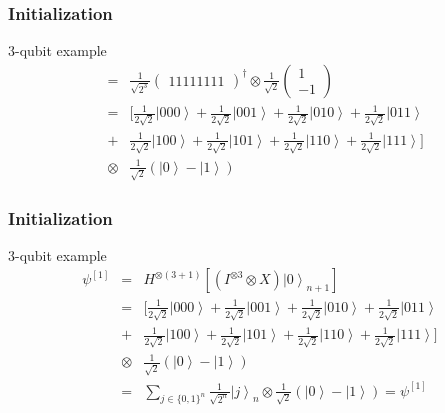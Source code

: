 \begin{frame}
	\frametitle{Initialization}
	\begin{exampleblock}{3-qubit example}
		\begin{eqnarray}
			&=&\frac{1}{\sqrt{2^{3}}}\begin{pmatrix*}
			1 1 1 1 1 1 1 1
			\end{pmatrix*}^{\dagger}\otimes\frac{1}{\sqrt{2}}\left(\begin{array}{c}
			1\\
			-1
			\end{array}\right)\nonumber\\
			&=&[ \frac{1}{2\sqrt{2}}\left.|000\right\rangle +\frac{1}{2\sqrt{2}}\left.|001\right\rangle +\frac{1}{2\sqrt{2}}\left.|010\right\rangle +\frac{1}{2\sqrt{2}}\left.|011\right\rangle \nonumber\\
			&+&\frac{1}{2\sqrt{2}}\left.|100\right\rangle +\frac{1}{2\sqrt{2}}\left.|101\right\rangle +\frac{1}{2\sqrt{2}}\left.|110\right\rangle +\frac{1}{2\sqrt{2}}\left.|111\right\rangle] \nonumber\\
			&\otimes&\frac{1}{\sqrt{2}}\left(\left.|0\right\rangle -\left.|1\right\rangle \right)		\nonumber	
		\end{eqnarray}
	\end{exampleblock}
\end{frame}

\begin{frame}{}
	\frametitle{Initialization}
	\begin{exampleblock}{3-qubit example}
		\begin{eqnarray}
			\psi^{[1]} &=&
			H^{\otimes\left(3+1\right)}\left[(I^{\otimes3}\otimes X)\left.|0\right\rangle _{n+1}\right]\nonumber\\
			&=&[\frac{1}{2\sqrt{2}}\left.|000\right\rangle +\frac{1}{2\sqrt{2}}\left.|001\right\rangle +\frac{1}{2\sqrt{2}}\left.|010\right\rangle +\frac{1}{2\sqrt{2}}\left.|011\right\rangle\nonumber\\ &+&\frac{1}{2\sqrt{2}}\left.|100\right\rangle +\frac{1}{2\sqrt{2}}\left.|101\right\rangle +\frac{1}{2\sqrt{2}}\left.|110\right\rangle +\frac{1}{2\sqrt{2}}\left.|111\right\rangle ]\nonumber\\
			&\otimes&\frac{1}{\sqrt{2}}\left(\left.|0\right\rangle -\left.|1\right\rangle \right)\nonumber\\
			&=&\sum_{j\in\{0,1\}^{n}}\frac{1}{\sqrt{2^{n}}}\left.|j\right\rangle _{n}\otimes\frac{1}{\sqrt{2}}\left(\left.|0\right\rangle -\left.|1\right\rangle \right)=\psi^{[1]}\nonumber
		\end{eqnarray}
	\end{exampleblock}
\end{frame}


